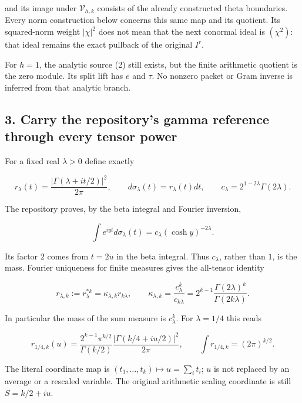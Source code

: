 and its image under \(\mathcal V_{h,k}\) consists of the already constructed theta boundaries. Every
norm construction below concerns this same map and its quotient. Its squared-norm weight
\(|\chi|^2\) does not mean that the next conormal ideal is \((\chi^2)\): that ideal remains the
exact pullback of the original \(I^r\).

For \(h=1\), the analytic source (2) still exists, but the finite arithmetic quotient is the zero
module. Its split lift has \(e\) and \(\tau\). No nonzero packet or Gram inverse is inferred from
that analytic branch.

\subsection{3. Carry the repository's gamma reference through every tensor
power}\label{gamma_convolution:carry-the-repositorys-gamma-reference-through-every-tensor-power}

For a fixed real \(\lambda>0\) define exactly

\[
r_\lambda(t)=\frac{|\Gamma(\lambda+it/2)|^2}{2\pi},\qquad
 d\sigma_\lambda(t)=r_\lambda(t)dt,\qquad
 c_\lambda=2^{1-2\lambda}\Gamma(2\lambda).                           \tag{5}
\]

The repository proves, by the beta integral and Fourier inversion,

\[
\int e^{iyt}d\sigma_\lambda(t)=c_\lambda(\cosh y)^{-2\lambda}.
                                                                    \tag{6}
\]

Its factor \(2\) comes from \(t=2u\) in the beta integral. Thus \(c_\lambda\), rather than \(1\), is
the mass. Fourier uniqueness for finite measures gives the all-tensor identity

\[
\boxed{
 r_{\lambda,k}:=r_\lambda^{*k}
 =\kappa_{\lambda,k}r_{k\lambda},\qquad
 \kappa_{\lambda,k}=\frac{c_\lambda^k}{c_{k\lambda}}
 =2^{k-1}\frac{\Gamma(2\lambda)^k}{\Gamma(2k\lambda)}.
}                                                                   \tag{7}
\]

In particular the mass of the sum measure is \(c_\lambda^k\). For \(\lambda=1/4\) this reads

\[
\boxed{
 r_{1/4,k}(u)=
 \frac{2^{k-1}\pi^{k/2}}{\Gamma(k/2)}
 \frac{|\Gamma(k/4+iu/2)|^2}{2\pi},\qquad
 \int r_{1/4,k}=(2\pi)^{k/2}.
}                                                                   \tag{8}
\]

The literal coordinate map is \((t_1,\ldots,t_k)\mapsto u=\sum_i t_i\); \(u\) is not replaced by an
average or a rescaled variable. The original arithmetic scaling coordinate is still \(S=k/2+iu\).


